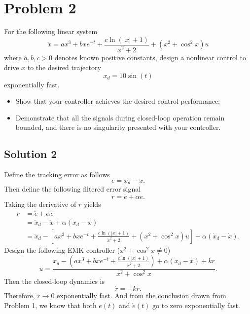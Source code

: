 \documentclass[12pt,a4paper]{article}
\begin{document}
\section*{Problem 2}
For the following linear system
$$
\ddot{x}=ax^3+bxe^{-t}+\frac{c\ln\left(|x|+1\right)}{\dot{x}^2+2}+\left(x^2+\cos^2x\right)u
$$
where $a,b,c>0$ denotes known positive constants, design a nonlinear control to drive $x$ to the desired trajectory
$$
x_d=10\sin(t)
$$
exponentially fast.
\begin{itemize}
    \item Show that your controller achieves the desired control performance;
    \item Demonstrate that all the signals during closed-loop operation remain bounded, and there is no singularity presented with your controller.
\end{itemize}

\subsection*{Solution 2}

\indent Define the tracking error as follows
\begin{equation}
e=x_d-x.
\label{e_2}
\end{equation}
Then define the following filtered error signal
\begin{equation}
r=\dot{e}+\alpha e.
\label{r_2}
\end{equation}
Taking the derivative of $r$ yields
\begin{equation}
\begin{aligned}
\dot{r} &= \ddot{e}+\alpha \dot{e} \\
        &= \ddot{x}_d-\ddot{x}+\alpha(\dot{x}_d-\dot{x}) \\
        &= \ddot{x}_d-\left[ax^3+bxe^{-t}+\frac{c\ln\left(|x|+1\right)}{\dot{x}^2+2}+ \left(x^2+\cos^2x\right)u\right]+\alpha(\dot{x}_d-\dot{x})
         .
\end{aligned}
\end{equation}
Design the following EMK controller ($x^2+\cos^2x\ne 0$)
\begin{equation}
u= \frac{\ddot{x}_d-\left(ax^3+bxe^{-t}+\frac{c\ln\left(|x|+1\right)}{\dot{x}^2+2}\right)+
    \alpha(\dot{x}_d-\dot{x})+kr}{x^2+\cos^2x}.
\end{equation}
Then the closed-loop dynamics is
\begin{equation}
\dot{r}=-kr.
\label{dr_2}
\end{equation}
Therefore, $r\to 0$ exponentially fast. And from the conclusion drawn from Problem 1, we know that both $e(t)$ and $\dot{e}(t)$ go to zero exponentially fast.
\end{document}

